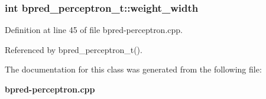 \subsubsection[{weight\_\-width}]{\setlength{\rightskip}{0pt plus 5cm}int {\bf bpred\_\-perceptron\_\-t::weight\_\-width}\hspace{0.3cm}{\tt  [protected]}}\label{classbpred__perceptron__t_6f886d304d7793a3fd04574983b94241}




Definition at line 45 of file bpred-perceptron.cpp.

Referenced by bpred\_\-perceptron\_\-t().

The documentation for this class was generated from the following file:\begin{CompactItemize}
\item 
{\bf bpred-perceptron.cpp}\end{CompactItemize}
